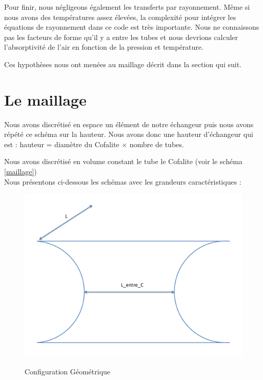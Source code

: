 	Pour finir, nous négligeons également les transferts par rayonnement. Même si nous avons des températures assez élevées, la complexité pour intégrer les équations de rayonnement dans ce code est très importante. Nous ne connaissons pas les facteurs de forme qu'il y a entre les tubes et nous devrions calculer l'absorptivité de l'air en fonction de la pression et température.

	Ces hypothèses nous ont menées au maillage décrit dans la section qui suit.




\newpage
\section{Le maillage}

Nous avons discrétisé en espace un élément de notre échangeur puis nous avons répété ce schéma sur la hauteur. Nous avons donc une hauteur d'échangeur qui est : hauteur = diamètre du Cofalite $\times$ nombre de tubes.

Nous avons discrétisé en volume constant le tube le Cofalite (voir le schéma \ref{maillage}) \\


Nous présentons ci-dessous les schémas avec les grandeurs caractéristiques :




\begin{figure}[!h]
\centering
\caption{Configuration Géométrique}
\includegraphics[scale=0.35]{PHOTO/Shema_conf_geo.pdf}
\label{conf_geo}
\end{figure}



